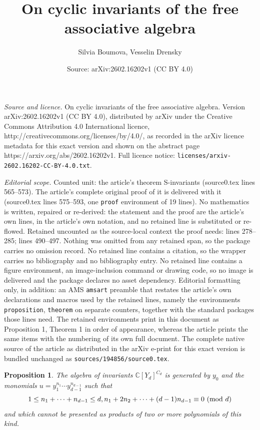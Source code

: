 \documentclass[10pt,a4paper]{amsart}
\title{On cyclic invariants of the free associative algebra}
\author{Silvia Boumova, Vesselin Drensky}
\date{Source: arXiv:2602.16202v1 (CC BY 4.0)}
\newtheorem{proposition}{Proposition}
\begin{document}
\maketitle

\noindent\emph{Source and licence.} On cyclic invariants of the free associative algebra. Version arXiv:2602.16202v1 (CC BY 4.0), distributed by arXiv under the Creative Commons Attribution 4.0 International licence, http://creativecommons.org/licenses/by/4.0/, as recorded in the arXiv licence metadata for this exact version and shown on the abstract page https://arxiv.org/abs/2602.16202v1. Full licence notice: \texttt{licenses/arxiv-2602.16202-CC-BY-4.0.txt}.\par\smallskip

\noindent\textit{Editorial scope.} Counted unit: the article's theorem S-invariants (source0.tex lines 565--573). The article's complete original proof of it is delivered with it (source0.tex lines 575--593, one \texttt{proof} environment of 19 lines). No mathematics is written, repaired or re-derived: the statement and the proof are the article's own lines, in the article's own notation, and no retained line is substituted or re-flowed.  Retained uncounted as the source-local context the proof needs: lines 278--285; lines 490--497.  Nothing was omitted from any retained span, so the package carries no omission record.  No retained line contains a citation, so the wrapper carries no bibliography and no bibliography entry.  No retained line contains a figure environment, an image-inclusion command or drawing code, so no image is delivered and the package declares no asset dependency.  Editorial formatting only, in addition: an AMS \texttt{amsart} preamble that restates the article's own declarations and macros used by the retained lines, namely the environments \texttt{proposition}, \texttt{theorem} on separate counters, together with the standard packages those lines need.  The retained environments print in this document as Proposition 1, Theorem 1 in order of appearance, whereas the article prints the same items with the numbering of its own full document.  The complete native source of the article as distributed in the arXiv e-print for this exact version is bundled unchanged as \texttt{sources/194856/source0.tex}.
\begin{proposition}\label{commutative case}
The algebra of invariants ${\mathbb C}[Y_d]^{C_d}$ is generated by $y_0$ and the monomials
$u=y_1^{n_1}\cdots y_{d-1}^{n_{d-1}}$ such that
\[
1\leq n_1+\cdots+n_{d-1}\leq d,n_1+2n_2+\cdots+(d-1)n_{d-1}\equiv 0 \text{ \rm (mod }d)
\]
and which cannot be presented as products of two or more polynomials of this kind.
\end{proposition}
\end{document}
